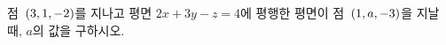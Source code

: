 점~$(3{,}\mkern3mu\mathopen{}1{,}\mkern3mu\mathopen{}-2)$를 지나고 평면 $2x+3y-z=4$에 평행한 평면이 점~$(1{,}\mkern3mu\mathopen{}a{,}\mkern3mu\mathopen{}-3)$을 지날 때, $a$의 값을 구하시오.
